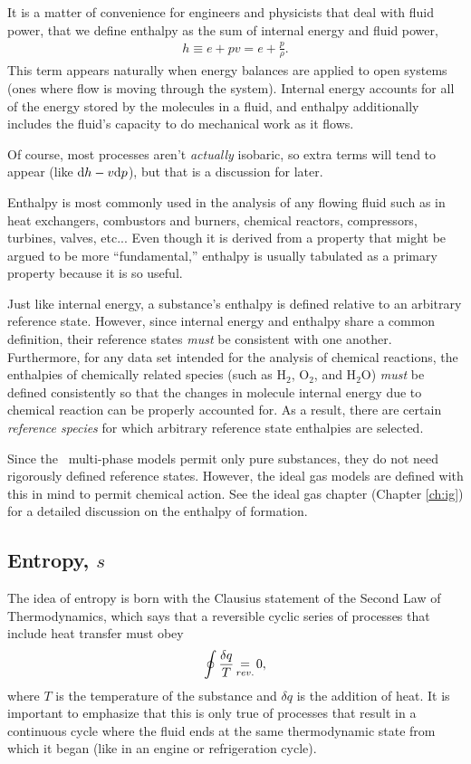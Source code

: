It is a matter of convenience for engineers and physicists that deal with fluid power, that we define enthalpy as the sum of internal energy and fluid power,
\begin{align}
h \equiv e + pv = e + \frac{p}{\rho}.
\end{align}
This term appears naturally when energy balances are applied to open systems (ones where flow is moving through the system).  Internal energy accounts for all of the energy stored by the molecules in a fluid, and enthalpy additionally includes the fluid's capacity to do mechanical work as it flows.

Of course, most processes aren't \emph{actually} isobaric, so extra terms will tend to appear (like $\mathrm{d} h - v \mathrm{d} p$), but that is a discussion for later.

Enthalpy is most commonly used in the analysis of any flowing fluid such as in heat exchangers, combustors and burners, chemical reactors, compressors, turbines, valves, etc...  Even though it is derived from a property that might be argued to be more ``fundamental,'' enthalpy is usually tabulated as a primary property because it is so useful.

Just like internal energy, a substance's enthalpy is defined relative to an arbitrary reference state.  However, since internal energy and enthalpy share a common definition, their reference states \emph{must} be consistent with one another.  Furthermore, for any data set intended for the analysis of chemical reactions, the enthalpies of chemically related species (such as H$_2$, O$_2$, and H$_2$O) \emph{must} be defined consistently so that the changes in molecule internal energy due to chemical reaction can be properly accounted for.  As a result, there are certain \emph{reference species} for which arbitrary reference state enthalpies are selected.  

Since the \PM\ multi-phase models permit only pure substances, they do not need rigorously defined reference states.  However, the ideal gas models are defined with this in mind to permit chemical action.  See the ideal gas chapter (Chapter \ref{ch:ig}) for a detailed discussion on the enthalpy of formation.

\subsection{Entropy, $s$}\label{sec:intro:s}

The idea of entropy is born with the Clausius statement of the Second Law of Thermodynamics, which says that a reversible cyclic series of processes that include heat transfer must obey
\begin{align}
\oint \frac{\delta q}{T} \operatorname*{=}_{rev.} 0,
\end{align}
where $T$ is the temperature of the substance and $\delta q$ is the addition of heat.  It is important to emphasize that this is only true of processes that result in a continuous cycle where the fluid ends at the same thermodynamic state from which it began (like in an engine or refrigeration cycle).

